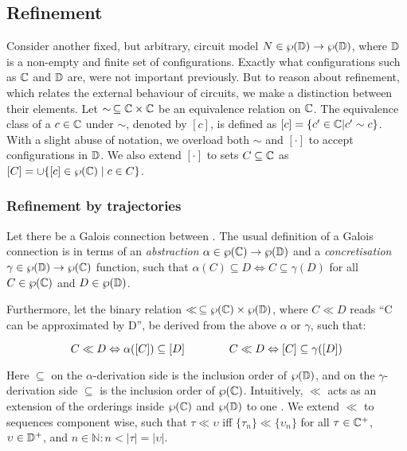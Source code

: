 \subsection{Refinement}

Consider another fixed, but arbitrary, circuit model $N \in \wp(\mathbb{D}) \rightarrow \wp(\mathbb{D})$, where $\mathbb{D}$ is a non-empty and finite set of configurations. Exactly what configurations such as $\mathbb{C}$ and $\mathbb{D}$ are, were not important previously. But to reason about refinement, which relates the external behaviour of circuits, we make a distinction between their elements. Let $\sim \, \subseteq \mathbb{C} \times \mathbb{C}$ be an equivalence relation on $\mathbb{C}$. The equivalence class of a $c \in \mathbb{C}$ under $\sim$, denoted by $[c]$, is defined as $[c] = \{ c' \in \mathbb{C} | c' \sim c \}$. With a slight abuse of notation, we overload both $\sim$ and $[\cdot]$ to accept configurations in $\mathbb{D}$. We also extend $[\cdot]$ to sets $C \subseteq \mathbb{C}$ as $[C] = \cup\{[c] \in \wp(\mathbb{C}) \mid c \in C \}$.


\subsubsection{Refinement by trajectories} %

Let there be a Galois connection between . The usual definition of a Galois connection is in terms of an \textit{abstraction} $\alpha \in \wp(\mathbb{C}) \rightarrow \wp(\mathbb{D})$ and a \textit{concretisation} $\gamma \in \wp(\mathbb{D}) \rightarrow \wp(\mathbb{C})$ function, such that $\alpha(C) \subseteq D \iff C \subseteq \gamma(D)$ for all $C \in \wp(\mathbb{C})$ and $D \in \wp(\mathbb{D})$. 

Furthermore, let the binary relation $\ll \, \subseteq \wp(\mathbb{C}) \times \wp(\mathbb{D})$, where $C \ll D$ reads ``C can be approximated by D'', be derived from the above $\alpha$ or $\gamma$, such that:

\begin{equation*}
C \ll D \Leftrightarrow \alpha([C]) \subseteq [D] \quad\quad\quad\quad C \ll D \Leftrightarrow [C] \subseteq \gamma([D])
\end{equation*}

\noindent Here $\subseteq$ on the $\alpha$-derivation side is the inclusion order of $\wp(\mathbb{D})$, and on the $\gamma$-derivation side $\subseteq$ is the inclusion order of $\wp(\mathbb{C})$. Intuitively, $\ll$ acts as an extension of the orderings inside $\wp(\mathbb{C})$ and $\wp(\mathbb{D})$ to one .  We extend $\ll$ to sequences component wise, such that $\tau \ll \upsilon$ iff $\{ \tau_{n} \} \ll \{ \upsilon_{n} \}$ for all $\tau \in \mathbb{C}^{+}$, $\upsilon \in \mathbb{D}^{+}$, and $n \in \mathbb{N} : n < | \tau | = | \upsilon |$.


